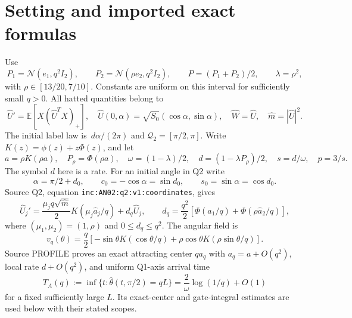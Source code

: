 \documentclass[11pt]{article}
\theoremstyle{remark}\newtheorem{remark}[theorem]{Remark}
\newcommand{\dd}{\,d}\newcommand{\E}{\mathbb E}
\newcommand{\Qtwo}{\mathcal Q_2}
\begin{document}
\section{Setting and imported exact formulas}
Use
\[
 P_1=\mathcal N(e_1,q^2I_2),\qquad P_2=\mathcal N(\rho e_2,q^2I_2),\qquad
 P=(P_1+P_2)/2,\qquad \lambda=\rho^2,
\]
with $\rho\in[13/20,7/10]$. Constants are uniform on this interval for sufficiently small $q>0$.
All hatted quantities belong to
\[
 \widehat U'=\E[X(\widehat U^TX)_+],\quad
 \widehat U(0,\alpha)=\sqrt{S_0}(\cos\alpha,\sin\alpha),\quad
 \widehat W=\widehat U,\quad \widehat m=|\widehat U|^2.
\]
The initial label law is $\dd\alpha/(2\pi)$ and $\Qtwo=[\pi/2,\pi]$.
Write $K(z)=\phi(z)+z\Phi(z)$, and let
\[
 a=\rho K(\rho a),\quad P_\rho=\Phi(\rho a),\quad
 \omega=(1-\lambda)/2,\quad d=(1-\lambda P_\rho)/2,\quad
 s=d/\omega,\quad p=3/s.
\]
The symbol $d$ here is a rate. For an initial angle in Q2 write
\[
 \alpha=\pi/2+d_0,\qquad c_0=-\cos\alpha=\sin d_0,\qquad
 s_0=\sin\alpha=\cos d_0.
\]
Source Q2, equation \texttt{inc:AN02:q2:v1:coordinates}, gives
\begin{equation}\label{inc:AN02:q2completion:v1:coordinates}
 \widehat U_j'=\frac{\mu_jq\sqrt{\widehat m}}2K(\mu_j\widehat a_j/q)
       +d_q\widehat U_j,\qquad
 d_q=\frac{q^2}{2}[\Phi(\widehat a_1/q)+\Phi(\rho\widehat a_2/q)],
\end{equation}
where $(\mu_1,\mu_2)=(1,\rho)$ and $0\le d_q\le q^2$.
The angular field is
\begin{equation}\label{inc:AN02:q2completion:v1:angle}
 v_q(\theta)=\frac q2[-\sin\theta K(\cos\theta/q)
                  +\rho\cos\theta K(\rho\sin\theta/q)].
\end{equation}
Source PROFILE proves an exact attracting center $qa_q$ with $a_q=a+O(q^2)$, local rate $d+O(q^2)$, and uniform Q1-axis arrival time
\begin{equation}\label{inc:AN02:q2completion:v1:axisarrival}
 T_A(q):=\inf\{t:\widehat\theta(t,\pi/2)=qL\}
       =\frac{2}{\omega}\log(1/q)+O(1)
\end{equation}
for a fixed sufficiently large $L$. Its exact-center and gate-integral estimates are used below with their stated scopes.
\end{document}
